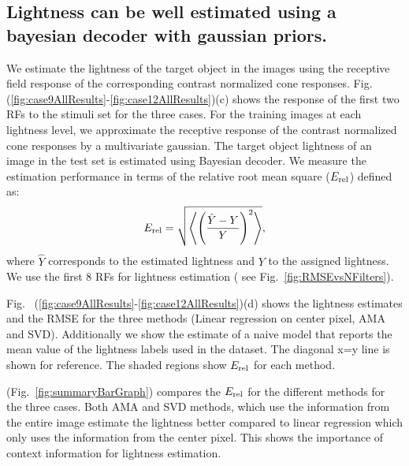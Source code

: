 \documentclass{jov}
\begin{document}
\subsection{Lightness can be well estimated using a bayesian decoder with gaussian priors.}
We estimate the lightness of the target object in the images using the receptive field response of the corresponding contrast normalized cone responses. Fig.~ (\ref{fig:case9AllResults}-\ref{fig:case12AllResults})(c) shows the response of the first two RFs to the stimuli set for the three cases. For the training images at each lightness level, we approximate the receptive response of the contrast normalized cone responses by a multivariate gaussian. The target object lightness of an image in the test set is estimated using Bayesian decoder. We measure the estimation performance in terms of the relative root mean square ($E_{\rm rel}$) defined as:
\begin{align}
E_{\rm rel} = \sqrt{\left\langle\left(\frac{\hat{Y}-Y}{Y}\right)^2\right\rangle},
\end{align}
where $\hat{Y}$ corresponds to the estimated lightness and $Y$ to the assigned lightness. We use the first 8 RFs for lightness estimation ( see Fig.~\ref{fig:RMSEvsNFilters}).

Fig.~ (\ref{fig:case9AllResults}-\ref{fig:case12AllResults})(d) shows the lightness estimates and the RMSE for the three methods (Linear regression on center pixel, AMA and SVD). Additionally we show the estimate of a naive model that reports the mean value of the lightness labels used in the dataset. The diagonal x=y line is shown for reference. The shaded regions show $E_{\rm rel}$ for each method.

(Fig.~\ref{fig:summaryBarGraph}) compares the $E_{\rm rel}$ for the different methods for the three cases. Both AMA and SVD methods, which use the information from the entire image estimate the lightness better compared to linear regression which only uses the information from the center pixel. This shows the importance of context information for lightness estimation.
\end{document}
